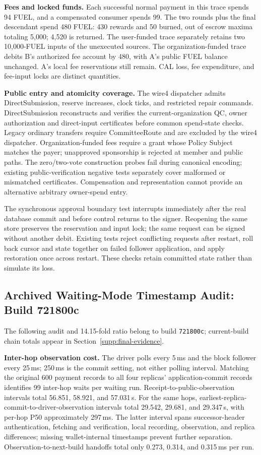 \noindent\textbf{Fees and locked funds.}
Each successful normal payment in this trace spends 94 FUEL, and a
compensated consumer spends 99. The two rounds plus the final descendant
spend 480 FUEL: 430 rewards and 50 burned, out of escrow maxima totaling
5,000; 4,520 is returned. The user-funded trace separately retains two
10,000-FUEL inputs of the unexecuted sources. The organization-funded
trace debits B's authorized fee account by 480, with A's public FUEL
balance unchanged. A's local fee reservations still remain. CAL loss,
fee expenditure, and fee-input locks are distinct quantities.

\noindent\textbf{Public entry and atomicity coverage.}
The wire4 dispatcher admits DirectSubmission, reserve increases, clock
ticks, and restricted repair commands. DirectSubmission reconstructs and
verifies the current-organization QC, owner authorization and direct-input
certificates before common spend-state checks. Legacy ordinary transfers
require CommitteeRoute and are excluded by the wire4 dispatcher.
Organization-funded fees require a grant whose Policy Subject matches
the payer; unapproved sponsorship is rejected at member and public paths.
The zero/two-vote construction probes fail during canonical encoding;
existing public-verification negative tests separately cover malformed or
mismatched certificates. Compensation and representation cannot provide
an alternative arbitrary owner-spend entry.

The synchronous approval boundary test interrupts immediately after the
real database commit and before control returns to the signer. Reopening
the same store preserves the reservation and input lock; the same request
can be signed without another debit. Existing tests reject conflicting
requests after restart, roll back cursor and state together on failed
follower application, and apply restoration once across restart. These
checks retain committed state rather than simulate its loss.

\subsection{Archived Waiting-Mode Timestamp Audit: Build 721800c}
The following audit and 14.15-fold ratio belong to build \texttt{721800c}; current-build chain totals appear in Section~\ref{supp:final-evidence}.

\noindent\textbf{Inter-hop observation cost.}
The driver polls every 5\,ms and the block follower every 25\,ms;
250\,ms is the commit setting, not either polling interval.
Matching the original 600 payment records to all four replicas'
application-commit records identifies 99 inter-hop waits per waiting
run. Receipt-to-public-observation intervals total
56.851, 58.921, and 57.031\,s.
For the same hops, earliest-replica-commit-to-driver-observation
intervals total 29.542, 29.681, and 29.347\,s, with per-hop
P50 approximately 297\,ms. The latter interval spans successor-header
authentication, fetching and verification, local recording, observation,
and replica differences; missing wallet-internal timestamps prevent
further separation. Observation-to-next-build handoffs total only
0.273, 0.314, and 0.315\,ms per run.

